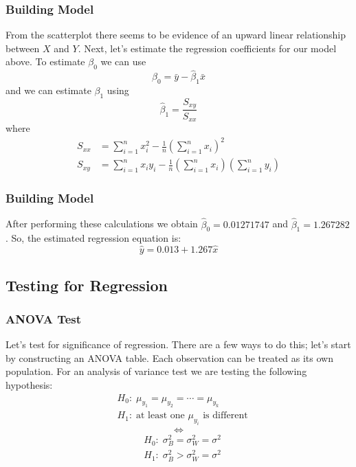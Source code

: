 \documentclass[12pt]{beamer}
\begin{document}
\begin{frame}
\frametitle{Building Model}
From the scatterplot there seems to be evidence of an upward linear relationship between $X$ and $Y$. Next, let's estimate the regression coefficients for our model above. To estimate $\beta_0$ we can use $$\hat{\beta}_0=\bar{y}-\hat{\beta}_1\bar{x}$$ and we can estimate $\beta_1$ using $$\hat{\beta}_1=\frac{S_{xy}}{S_{xx}}$$ where
\begin{align*}
S_{xx}&=\sum_{i=1}^nx_i^2-\frac{1}{n}\left(\sum_{i=1}^nx_i\right)^2\\
S_{xy}&=\sum_{i=1}^nx_iy_i-\frac{1}{n}\left(\sum_{i=1}^nx_i\right)\left(\sum_{i=1}^ny_i\right)
\end{align*}
\end{frame}

\begin{frame}
\frametitle{Building Model}
After performing these calculations we obtain $\hat{\beta}_0=0.01271747$ and $\hat{\beta}_1=1.267282$. So, the estimated regression equation is: $$\hat{y}=0.013+1.267\hat{x}$$
\end{frame}

\subsection{Testing for Regression}
\begin{frame}
\frametitle{ANOVA Test}
Let's test for significance of regression. There are a few ways to do this; let's start by constructing an ANOVA table. Each observation can be treated as its own population. For an analysis of variance test we are testing the following hypothesis:
\begin{align*}
	&H_0:\;\mu_{y_1}=\mu_{y_2}=\cdots=\mu_{y_k}\\
	&H_1:\; \text{at least one $\mu_{y_i}$ is different}
\end{align*}
$$\iff$$
\begin{align*}
	&H_0:\; \sigma_B^2=\sigma_W^2=\sigma^2\\
	&H_1:\; \sigma_B^2>\sigma_W^2=\sigma^2
\end{align*}
\end{frame}
\end{document}
